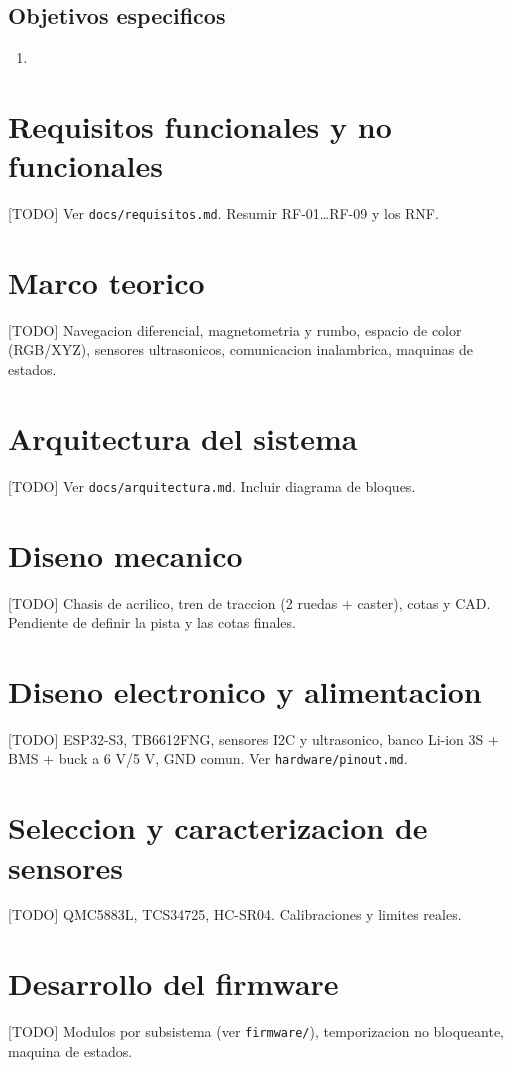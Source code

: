 \documentclass[journal]{IEEEtran}
\begin{document}
\subsection{Objetivos especificos}
\begin{enumerate}[1.]
\item [TODO]
\end{enumerate}

\section{Requisitos funcionales y no funcionales}
[TODO] Ver \texttt{docs/requisitos.md}. Resumir RF-01\dots RF-09 y los RNF.

\section{Marco teorico}
[TODO] Navegacion diferencial, magnetometria y rumbo, espacio de color
(RGB/XYZ), sensores ultrasonicos, comunicacion inalambrica, maquinas de estados.

\section{Arquitectura del sistema}
[TODO] Ver \texttt{docs/arquitectura.md}. Incluir diagrama de bloques.

\section{Diseno mecanico}
[TODO] Chasis de acrilico, tren de traccion (2 ruedas + caster), cotas y CAD.
Pendiente de definir la pista y las cotas finales.

\section{Diseno electronico y alimentacion}
[TODO] ESP32-S3, TB6612FNG, sensores I2C y ultrasonico, banco Li-ion 3S + BMS
+ buck a 6 V/5 V, GND comun. Ver \texttt{hardware/pinout.md}.

\section{Seleccion y caracterizacion de sensores}
[TODO] QMC5883L, TCS34725, HC-SR04. Calibraciones y limites reales.

\section{Desarrollo del firmware}
[TODO] Modulos por subsistema (ver \texttt{firmware/}), temporizacion no
bloqueante, maquina de estados.
\end{document}
